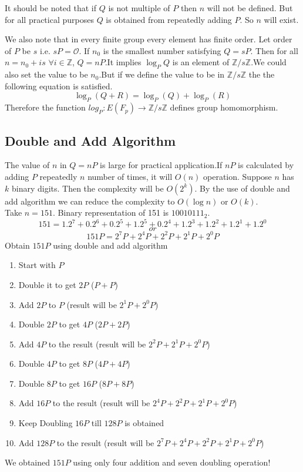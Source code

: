 \documentclass[a4paper,12pt]{report}
\begin{document}
It should be noted that if $Q$ is not multiple of $P$ then $n$ will not be defined. But for all practical purposes $Q$ is obtained from repeatedly adding $P$. So $n$ will exist.

We also note that in every finite group every element has finite order. Let order of $P$ be $s$ i.e. $s P=\mathscr{O}$. If $n_0$ is the smallest number satisfying $Q=sP$. Then for all $n=n_0+is$ $ \forall i \in \mathbb{Z} $, $Q=nP$.It implies $\log_P Q$ is an element of  $\mathbb{Z}/s\mathbb{Z}$.We could also set the value to be $n_0$.But if we define the value to be in $\mathbb{Z}/s\mathbb{Z}$ the the following equation is satisfied.
$$\log_P(Q+R)=\log_P(Q)+\log_P(R)$$
Therefore the function
$log_P:E(F_p)\rightarrow \mathbb{Z}/s\mathbb{Z}$ defines group homomorphism.
\subsection{Double and Add Algorithm}
The value of $n$ in $Q=nP$ is large for practical application.If $nP$ is calculated by adding $P$ repeatedly $n$ number of times, it will $O(n)$ operation. Suppose $n$ has $k$ binary digits. Then the complexity will be $O(2^k)$. By the use of double and add algorithm we can reduce the complexity to $O(\log {n})$ or $O(k)$.\\
Take $n=151$. Binary representation of 151 is $10010111_2$.
$$151=1.2^7+0.2^6+0.2^5+1.2^5+0.2^4+1.2^3+1.2^2+1.2^1+1.2^0$$
$$or$$
$$151P = 2^7P+2^4P+2^2P+2^1P+2^0P$$
Obtain $151P$ using double and add algorithm
\begin{enumerate}
	\item Start with $P$
	\item Double it to get $2P$ ($P+P$)
	\item Add $2P$ to $P$ (result will be $2^1P+2^0P$)
	\item Double $2P$ to get $4P$ ($2P+2P$)
	\item Add $4P$ to the result (result will be $2^2P+2^1P+2^0P$)
	\item Double $4P$ to get $8P$ ($4P+4P$)
	\item Double $8P$ to get $16P$ ($8P+8P$)
	\item Add $16P$ to the result (result will be $2^4P+2^2P+2^1P+2^0P$)
	\item Keep Doubling $16P$ till $128P$ is obtained
	\item Add $128P$ to the result (result will be $2^7P+2^4P+2^2P+2^1P+2^0P$)
\end{enumerate}
We obtained $151P$ using only four addition and seven doubling operation!
\cleardoublepage
\end{document}
